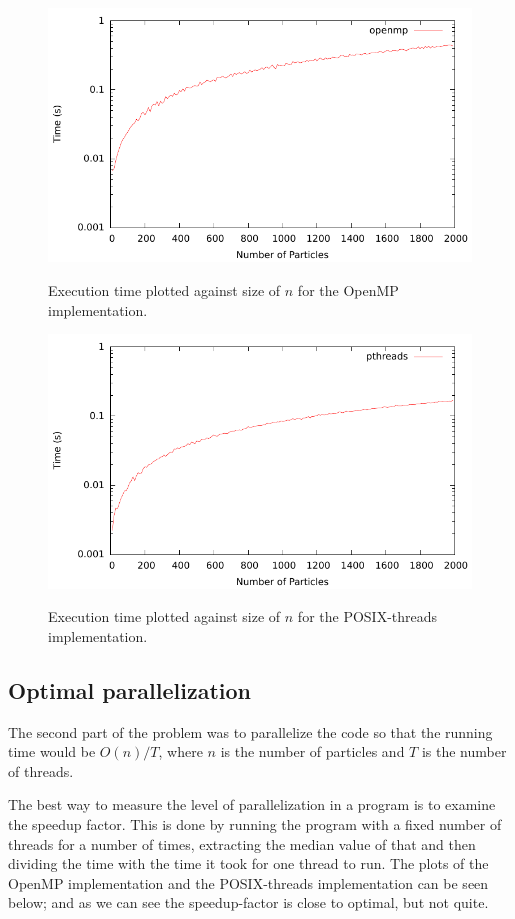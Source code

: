 \begin{figure}[H]
	\includegraphics{plots/openmp.pdf}
	\label{openmp_linear}
	\caption{Execution time plotted against size of $n$ for the OpenMP implementation.}
\end{figure}
\begin{figure}[H]
	\includegraphics{plots/pthreads.pdf}
	\label{pthreads_linear}
	\caption{Execution time plotted against size of $n$ for the POSIX-threads implementation.}
\end{figure}

\subsection{Optimal parallelization}

The second part of the problem was to parallelize the code so that the running time would be $O(n) / T$, where $n$ is the number of particles and $T$ is the number of threads.

The best way to measure the level of parallelization in a program is to examine the speedup factor. This is done by running the program with a fixed number of threads for a number of times, extracting the median value of that and then dividing the time with the time it took for one thread to run. The plots of the OpenMP implementation and the POSIX-threads implementation can be seen below; and as we can see the speedup-factor is close to optimal, but not quite.

